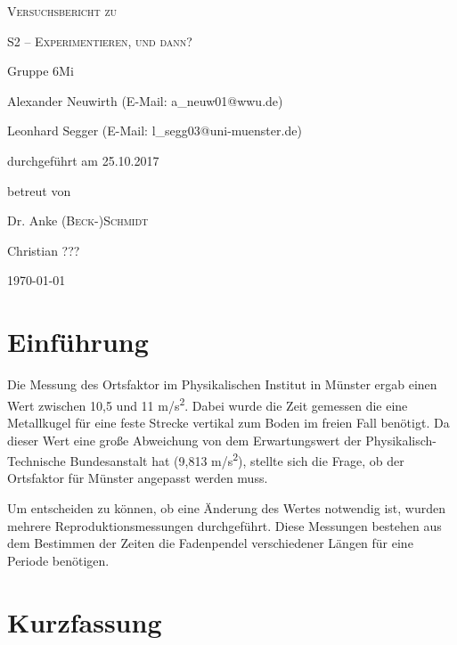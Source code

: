 \documentclass[
	a4paper,
	12pt,
	pagesize,
	ngerman
]{scrartcl}
\begin{document}
	\begin{titlepage}
		\centering
		{\scshape\LARGE Versuchsbericht zu \par}
		\vspace{1cm}
		{\scshape\huge S2 -- Experimentieren, und dann?\par}
		\vspace{2.5cm}
		{\LARGE Gruppe 6Mi \par}
		\vspace{0.5cm}
		
		{\large Alexander Neuwirth (E-Mail: a\_neuw01@wwu.de) \par}
		{\large Leonhard Segger (E-Mail: l\_segg03@uni-muenster.de) \par}
		\vfill
		
		durchgeführt am 25.10.2017\par
		betreut von\par
		{\large Dr. Anke \textsc{(Beck-)Schmidt}} \par%
		{\large Christian \textsc{???}} %
		
		\vfill
		
		{\large \today\par}
	\end{titlepage}
	\tableofcontents
	
	\newpage
	\section{Einführung}
	
	Die Messung des Ortsfaktor im Physikalischen Institut in Münster ergab einen Wert zwischen 10,5 und 11 \si{m/s^2}. Dabei wurde die Zeit gemessen die eine Metallkugel für eine feste Strecke vertikal zum Boden im freien Fall benötigt. Da dieser Wert eine große Abweichung von dem Erwartungswert der Physikalisch-Technische Bundesanstalt hat (9,813 \si{m/s^2}), stellte sich die Frage, ob der Ortsfaktor für Münster angepasst werden muss.\par
	Um entscheiden zu können, ob eine Änderung des Wertes notwendig ist, wurden mehrere Reproduktionsmessungen durchgeführt. Diese Messungen bestehen aus dem Bestimmen der Zeiten die Fadenpendel verschiedener Längen für eine Periode benötigen.  
	
	\newpage
	\section{Kurzfassung}
	
\end{document}
